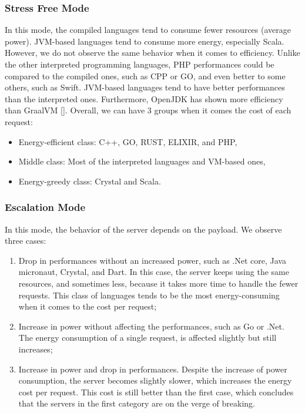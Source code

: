 \subsubsection{Stress Free Mode}
In this mode, the compiled languages tend to consume fewer resources (average power).
JVM-based languages tend to consume more energy, especially Scala.
However, we do not observe the same behavior when it comes to efficiency.
Unlike the other interpreted programming languages, PHP performances could be compared to the compiled ones, such as CPP or GO, and even better to some others, such as Swift.
JVM-based languages tend to have better performances than the interpreted ones.
Furthermore, OpenJDK has shown more efficiency than GraalVM [].
Overall, we can have 3 groups when it comes the cost of each request:
\begin{itemize}
    \item Energy-efficient class: C++, GO, RUST, ELIXIR, and PHP,
    \item Middle class: Most of the interpreted languages and VM-based ones,
    \item Energy-greedy class: Crystal and Scala.
\end{itemize}

\subsubsection{Escalation Mode}
In this mode, the behavior of the server depends on the payload. We observe three cases:
\begin{enumerate}
    \item Drop in performances without an increased power, such as .Net core, Java micronaut, Crystal, and Dart.
          In this case, the server keeps using the same resources, and sometimes less, because it takes more time to handle the fewer requests.
          This class of languages tends to be the most energy-consuming when it comes to the cost per request;
    \item Increase in power without affecting the performances, such as Go or .Net.
          The energy consumption of a single request, is affected slightly but still increases;
    \item Increase in power and drop in performances.
          Despite the increase of power consumption, the server becomes slightly slower, which increases the energy cost per request.
          This cost is still better than the first case, which concludes that the servers in the first category are on the verge of breaking.
\end{enumerate}

